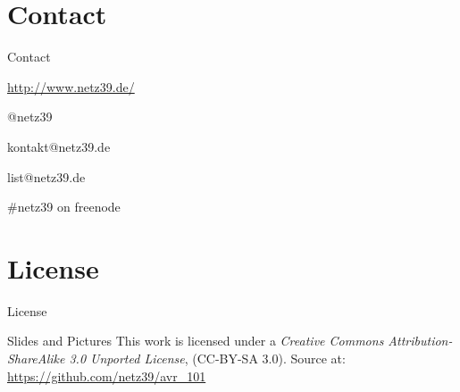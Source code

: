 \documentclass{beamer}
\begin{document}
\section{Contact}

\begin{frame}{Contact}
    \begin{center}
        \begin{description}
            \item[WWW] \url{http://www.netz39.de/}
            \item[Twitter/identi.ca] @netz39
            \item[E-Mail] kontakt@netz39.de
            \item[Mailingliste] list@netz39.de
            \item[IRC] \#netz39 on freenode
        \end{description}
    \end{center}
\end{frame}

\appendix

\section{License}

\begin{frame}{License}
    \begin{block}{Slides and Pictures}
        This work is licensed under a \emph{Creative Commons
        Attribution-ShareAlike 3.0 Unported License}, (CC-BY-SA 3.0).
        Source at: \url{https://github.com/netz39/avr_101}
    \end{block}
\end{frame}
\end{document}
